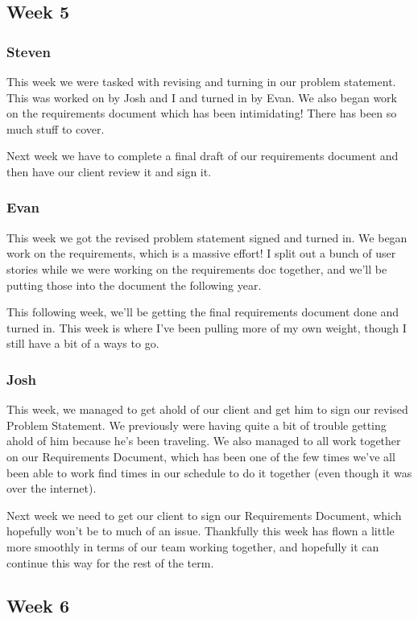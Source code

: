 \documentclass[onecolumn, draftclsnofoot,10pt, compsoc]{IEEEtran}
\begin{document}
\subsection{Week 5}
\subsubsection{Steven}

This week we were tasked with revising and turning in our problem statement. This was worked on by Josh and I and turned in by Evan. We also began work on the requirements document which has been intimidating! There has been so much stuff to cover.

Next week we have to complete a final draft of our requirements document and then have our client review it and sign it. 

\subsubsection{Evan}

This week we got the revised problem statement signed and turned in. We began work on the requirements, which is a massive effort! I split out a bunch of user stories while we were working on the requirements doc together, and we'll be putting those into the document the following year.

This following week, we'll be getting the final requirements document done and turned in. This week is where I've been pulling more of my own weight, though I still have a bit of a ways to go.

\subsubsection{Josh}

This week, we managed to get ahold of our client and get him to sign our revised Problem Statement. We previously were having quite a bit of trouble getting ahold of him because he's been traveling. We also managed to all work together on our Requirements Document, which has been one of the few times we've all been able to work find times in our schedule to do it together (even though it was over the internet). 

Next week we need to get our client to sign our Requirements Document, which hopefully won't be to much of an issue. Thankfully this week has flown a little more smoothly in terms of our team working together, and hopefully it can continue this way for the rest of the term.
\subsection{Week 6}
\end{document}
